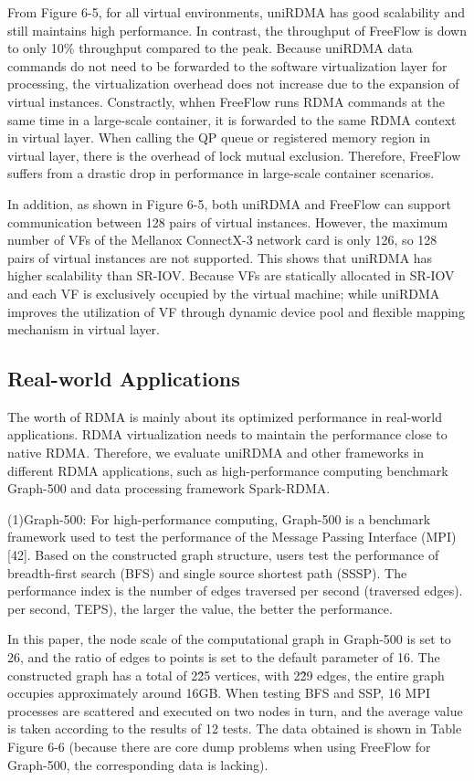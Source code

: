 From Figure 6-5, for all virtual environments, uniRDMA has good scalability and still maintains high performance. In contrast, the throughput of FreeFlow is down to only 10\% throughput compared to the peak. Because uniRDMA data commands do not need to be forwarded to the software virtualization layer for processing, the virtualization overhead does not increase due to the expansion of virtual instances. Constractly, whhen FreeFlow runs RDMA commands at the same time in a large-scale container, it is forwarded to the same RDMA context in virtual layer. When calling the QP queue or registered memory region in virtual layer, there is the overhead of lock mutual exclusion. Therefore, FreeFlow suffers from a drastic drop in performance in large-scale container scenarios.

In addition, as shown in Figure 6-5, both uniRDMA and FreeFlow can support communication between 128 pairs of virtual instances. However, the maximum number of VFs of the Mellanox ConnectX-3 network card is only 126, so 128 pairs of virtual instances are not supported. This shows that uniRDMA has higher scalability than SR-IOV. Because VFs are statically allocated in SR-IOV and each VF is exclusively occupied by the virtual machine; while uniRDMA improves the utilization of VF through  dynamic device pool and flexible mapping mechanism in virtual layer.

\subsection{Real-world Applications}

The worth of RDMA is mainly about its optimized performance in real-world applications. RDMA virtualization needs to maintain the performance close to native RDMA. Therefore, we evaluate uniRDMA and other frameworks in different RDMA applications, such as high-performance computing benchmark Graph-500 and data processing framework Spark-RDMA.

(1)Graph-500: For high-performance computing, Graph-500 is a benchmark framework used to test the performance of the Message Passing Interface (MPI) [42]. Based on the constructed graph structure, users test the performance of breadth-first search (BFS) and single source shortest path (SSSP). The performance index is the number of edges traversed per second (traversed edges). per second, TEPS), the larger the value, the better the performance.

In this paper, the node scale of the computational graph in Graph-500 is set to 26, and the ratio of edges to points is set to the default parameter of 16. The constructed graph has a total of 2\^25 vertices, with 2\^29 edges, the entire graph occupies approximately around 16GB. When testing BFS and SSP, 16 MPI processes are scattered and executed on two nodes in turn, and the average value is taken according to the results of 12 tests. The data obtained is shown in Table Figure 6-6 (because there are core dump problems when using FreeFlow for Graph-500, the corresponding data is lacking).

